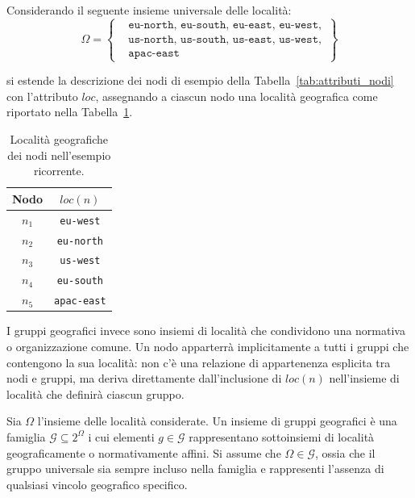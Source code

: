 Considerando il seguente insieme universale delle località: 
\begin{equation}
    \Omega = \left\{ 
    \begin{aligned}
        &\mathtt{eu\text{-}north},\, \mathtt{eu\text{-}south},\, \mathtt{eu\text{-}east},\, \mathtt{eu\text{-}west},
        \\
        &\mathtt{us\text{-}north},\, \mathtt{us\text{-}south},\, \mathtt{us\text{-}east},\, \mathtt{us\text{-}west},
        \\
        &\mathtt{apac\text{-}east}
    \end{aligned}
    \right\}
\end{equation} 

si estende la descrizione dei nodi di esempio della Tabella~\ref{tab:attributi_nodi} con l'attributo $loc$, assegnando a ciascun nodo una località geografica come riportato nella Tabella~\ref{tab:localita_nodi}.

\begin{table}[ht]
    \centering
    \begin{tabular}{cc}
        \toprule
        \textbf{Nodo} & $loc(n)$ \\
        \midrule
        $n_1$ & \texttt{eu-west}  \\
        $n_2$ & \texttt{eu-north} \\
        $n_3$ & \texttt{us-west} \\
        $n_4$ & \texttt{eu-south} \\
        $n_5$ & \texttt{apac-east} \\
        \bottomrule
    \end{tabular}
    \caption{Località geografiche dei nodi nell'esempio ricorrente.}
    \label{tab:localita_nodi}
\end{table}

I gruppi geografici invece sono insiemi di località che condividono una normativa o organizzazione comune. Un nodo apparterrà implicitamente a tutti i gruppi che contengono la sua località: non c'è una relazione di appartenenza esplicita tra nodi e gruppi, ma deriva direttamente dall'inclusione di $loc(n)$ nell'insieme di località che definirà ciascun gruppo.

\begin{definition}
    \label{def:gruppi_geografici}
    Sia $\Omega$ l'insieme delle località considerate. Un insieme di gruppi geografici è una famiglia $\mathcal{G} \subseteq 2^{\Omega}$ i cui elementi $g \in \mathcal{G}$ rappresentano sottoinsiemi di località geograficamente o normativamente affini. Si assume che $\Omega \in \mathcal{G}$, ossia che il gruppo universale sia sempre incluso nella famiglia e rappresenti l'assenza di qualsiasi vincolo geografico specifico. 
\end{definition}

